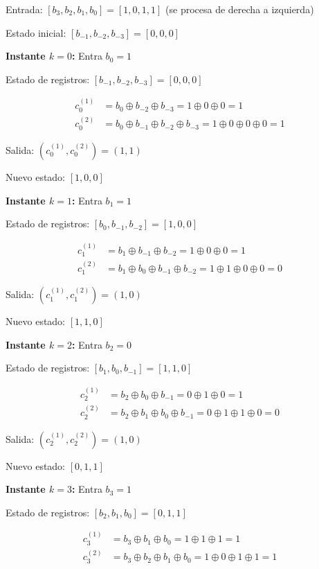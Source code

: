 \documentclass[11pt,a4paper]{article}
\begin{document}
Entrada: $[b_3, b_2, b_1, b_0] = [1, 0, 1, 1]$ (se procesa de derecha a izquierda)

Estado inicial: $[b_{-1}, b_{-2}, b_{-3}] = [0, 0, 0]$

\textbf{Instante $k=0$:} Entra $b_0 = 1$

Estado de registros: $[b_{-1}, b_{-2}, b_{-3}] = [0, 0, 0]$

\begin{align*}
c_0^{(1)} &= b_0 \oplus b_{-2} \oplus b_{-3} = 1 \oplus 0 \oplus 0 = 1 \\
c_0^{(2)} &= b_0 \oplus b_{-1} \oplus b_{-2} \oplus b_{-3} = 1 \oplus 0 \oplus 0 \oplus 0 = 1
\end{align*}

Salida: $(c_0^{(1)}, c_0^{(2)}) = (1, 1)$

Nuevo estado: $[1, 0, 0]$

\textbf{Instante $k=1$:} Entra $b_1 = 1$

Estado de registros: $[b_0, b_{-1}, b_{-2}] = [1, 0, 0]$

\begin{align*}
c_1^{(1)} &= b_1 \oplus b_{-1} \oplus b_{-2} = 1 \oplus 0 \oplus 0 = 1 \\
c_1^{(2)} &= b_1 \oplus b_0 \oplus b_{-1} \oplus b_{-2} = 1 \oplus 1 \oplus 0 \oplus 0 = 0
\end{align*}

Salida: $(c_1^{(1)}, c_1^{(2)}) = (1, 0)$

Nuevo estado: $[1, 1, 0]$

\textbf{Instante $k=2$:} Entra $b_2 = 0$

Estado de registros: $[b_1, b_0, b_{-1}] = [1, 1, 0]$

\begin{align*}
c_2^{(1)} &= b_2 \oplus b_0 \oplus b_{-1} = 0 \oplus 1 \oplus 0 = 1 \\
c_2^{(2)} &= b_2 \oplus b_1 \oplus b_0 \oplus b_{-1} = 0 \oplus 1 \oplus 1 \oplus 0 = 0
\end{align*}

Salida: $(c_2^{(1)}, c_2^{(2)}) = (1, 0)$

Nuevo estado: $[0, 1, 1]$

\textbf{Instante $k=3$:} Entra $b_3 = 1$

Estado de registros: $[b_2, b_1, b_0] = [0, 1, 1]$

\begin{align*}
c_3^{(1)} &= b_3 \oplus b_1 \oplus b_0 = 1 \oplus 1 \oplus 1 = 1 \\
c_3^{(2)} &= b_3 \oplus b_2 \oplus b_1 \oplus b_0 = 1 \oplus 0 \oplus 1 \oplus 1 = 1
\end{align*}
\end{document}
